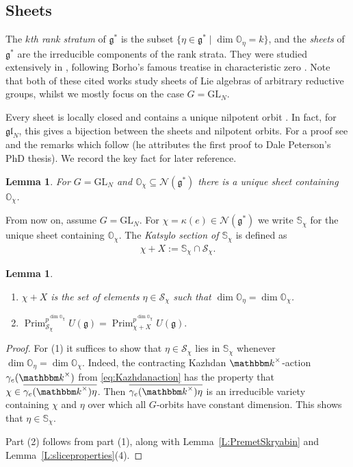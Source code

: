 \documentclass[twoside,12pt,reqno]{amsart}
\newtheorem{Lemma}[Theorem]{Lemma}
\theoremstyle{remark}
\numberwithin{equation}{section}
\def\k{{\mathbbm k}}
\def\Prim{\operatorname{Prim}}
\def\O{{\mathbb O}}
\def\bbS{\mathbb{S}}
\def\GL{\mathrm{GL}}
\def\g{{\mathfrak g}}
\def\gl{\mathfrak{gl}}
\renewcommand{\S}{\mathcal{S}}
\newcommand{\Nc}{\mathcal{N}}
\begin{document}
\subsection{Sheets}\label{ss:sheets}

The {\it $k$th rank stratum} of $\g^*$ is the subset $\{\eta \in \g^* \mid \dim \O_\eta = k\}$, and the {\em sheets} of $\g^*$ are the irreducible components of the rank strata. They were studied extensively in \cite{PS}, following Borho's famous treatise in characteristic zero \cite{Bo}. Note that both of these cited works study sheets of Lie algebras of arbitrary reductive groups, whilst we mostly focus on the case $G = \GL_N$.

Every sheet is locally closed and contains a unique nilpotent orbit \cite[Proposition~2.5]{PS}. In fact, for $\gl_N$, this gives a bijection between the sheets and nilpotent orbits. For a proof see \cite[Proposition~2.3]{Bon} and the remarks which follow (he attributes the first proof to Dale Peterson's PhD thesis). We record the key fact for later reference.

\begin{Lemma}
For $G = \GL_N$ and $\O_\chi \subseteq \Nc(\g^*)$ there is a unique sheet containing $\O_\chi$.
\end{Lemma}



From now on, assume $G=\GL_N$. For $\chi = \kappa(e) \in \Nc(\g^*)$ we write $\bbS_\chi$ for the unique sheet containing $\O_\chi$. The {\it Katsylo section of $\bbS_\chi$} is defined as
\begin{eqnarray}
\chi + X := \bbS_\chi \cap \S_\chi.
\end{eqnarray}

\begin{Lemma}
\label{L:dogwobble}
    \begin{enumerate}
        \item $\chi + X$ is the set of elements $\eta\in \S_\chi$ such that $\dim \O_\eta = \dim \O_\chi$. 
        \item $\Prim_{\S_\chi}^{p^{\dim \O_\chi}} U(\g)=\Prim_{\chi+X}^{p^{\dim \O_\chi}} U(\g).$
    \end{enumerate}
\end{Lemma}
\begin{proof}
For (1) it suffices to show that $\eta \in \S_\chi$ lies in $\bbS_\chi$ whenever $\dim \O_\eta = \dim \O_\chi$. Indeed, the contracting Kazhdan $\k^\times$-action $\gamma_e(\k^\times)$ from \eqref{eq:Kazhdanaction} has the property that $\chi \in \overline{\gamma_e(\k^\times) \eta}$. Then $\overline{\gamma_e(\k^\times) \eta}$ is an irreducible variety containing $\chi$ and $\eta$ over which all $G$-orbits have constant dimension. This shows that $\eta \in \bbS_\chi$.

Part (2) follows from part (1), along with Lemma~\ref{L:PremetSkryabin} and Lemma~\ref{L:sliceproperties}(4).
\end{proof}
\end{document}
